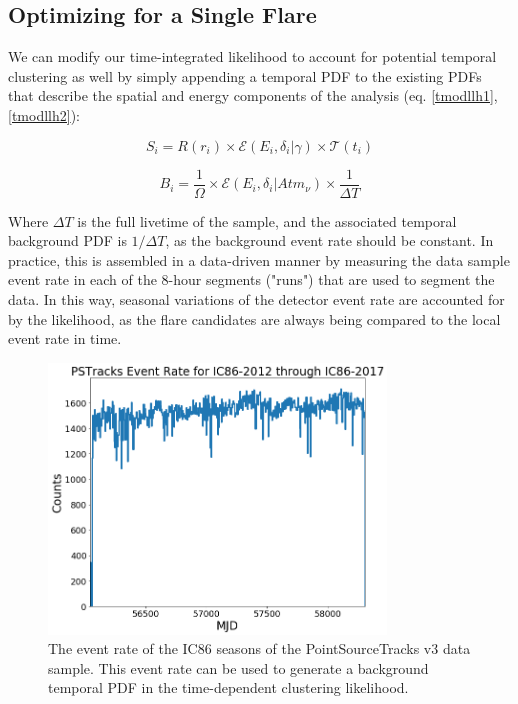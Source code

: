 \subsection{Optimizing for a Single Flare}
We can modify our time-integrated likelihood to account for potential temporal clustering as well by simply appending a temporal PDF to the existing PDFs that describe the spatial and energy components of the analysis (eq. \ref{tmodllh1}, \ref{tmodllh2}):

\begin{equation}
    S_i = R(r_i) \times \mathcal{E}(E_i, \delta_i|\gamma) \times \mathcal{T}(t_i)
    \label{tmodllh1}
\end{equation}

\begin{equation}
    B_i = \frac{1}{\Omega}\times \mathcal{E}(E_i,\delta_i|Atm_{\nu}) \times \frac{1}{\Delta T}
    \label{tmodllh2}
\end{equation}

Where $\Delta T$ is the full livetime of the sample, and the associated temporal background PDF is $1/\Delta T$, as the background event rate should be constant. In practice, this is assembled in a data-driven manner by measuring the data sample event rate in each of the 8-hour segments ("runs") that are used to segment the data. In this way, seasonal variations of the detector event rate are accounted for by the likelihood, as the flare candidates are always being compared to the local event rate in time.

\begin{figure}[h]
\centering
\includegraphics[width=0.8\textwidth]{figs/evt_rate.png}
\caption{The event rate of the IC86 seasons of the PointSourceTracks v3 data sample. This event rate can be used to generate a background temporal PDF in the time-dependent clustering likelihood.}
\label{fig:evt_rate}
\end{figure}

